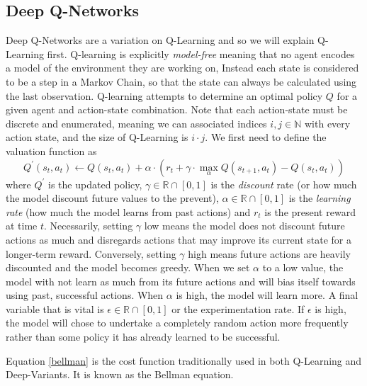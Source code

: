 \documentclass[doc, onecolumn, 12pt]{apa6}
\begin{document}
\subsection{Deep Q-Networks}
Deep Q-Networks are a variation on Q-Learning and so we will explain Q-Learning first. Q-learning is explicitly \emph{model-free} meaning that no agent encodes a model of the environment they are working on, Instead each state is considered to be a step in a Markov Chain, so that the state can always be calculated using the last observation. Q-learning attempts to determine an optimal policy $Q$ for a given agent and action-state combination. Note that each action-state must be discrete and enumerated, meaning we can associated indices $i, j \in \mathbb{N}$ with every action state, and the size of Q-Learning is $i \cdot j$. We first need to define the valuation function as 
\begin{equation} 
\label{bellman}
Q^{\prime}(s_{t}, a_{t}) \leftarrow Q(s_{t}, a_{t}) + \alpha \cdot \left( r_{t} + \gamma \cdot \max_{\alpha} Q(s_{t+1}, a_{t}) - Q(s_{t}, a_{t}) \right)
\end{equation}  where $Q^{\prime}$ is the updated policy, $\gamma \in \mathbb{R} \cap [0,1]$ is the \emph{discount} rate (or how much the model discount future values to the prevent), $\alpha \in \mathbb{R} \cap [0,1]$ is the \emph{learning rate} (how much the model learns from past actions) and $r_{t}$ is the present reward at time $t$.  Necessarily, setting $\gamma$ low means the model does not discount future actions as much and disregards actions that may improve its current state for a longer-term reward. Conversely, setting $\gamma$ high means future actions are heavily discounted and the model becomes greedy. When we set $\alpha$ to a low value, the model with not learn as much from its future actions and will bias itself towards using past, successful actions. When $\alpha$ is high, the model will learn more. A final variable that is vital is $\epsilon \in \mathbb{R} \cap [0,1]$ or the experimentation rate. If $\epsilon$ is high, the model will chose to undertake a completely random action more frequently rather than some policy it has already learned to be successful. 

Equation \ref{bellman} is the cost function traditionally used in both Q-Learning and Deep-Variants. It is known as the Bellman equation. 
\end{document}
